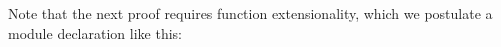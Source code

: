 %
Note that the next proof requires function extensionality, which we postulate a module declaration like this:
\AgdaSpace{}%
\AgdaModule{\AgdaUnderscore{}}\AgdaSpace{}%
\AgdaSymbol{\{}\AgdaSpace{}%
\AgdaSpace{}%
\AgdaSymbol{:}\AgdaSpace{}%
\AgdaSymbol{\}\{}\AgdaSpace{}%
\AgdaSymbol{:}\AgdaSpace{}%
\AgdaSpace{}%
\AgdaSpace{}%
\AgdaSymbol{\}\{}\AgdaSpace{}%
\AgdaSymbol{:}\AgdaSpace{}%
\AgdaSpace{}%
\AgdaSymbol{\}\{}\AgdaSpace{}%
\AgdaSymbol{:}\AgdaSpace{}%
\AgdaSpace{}%
